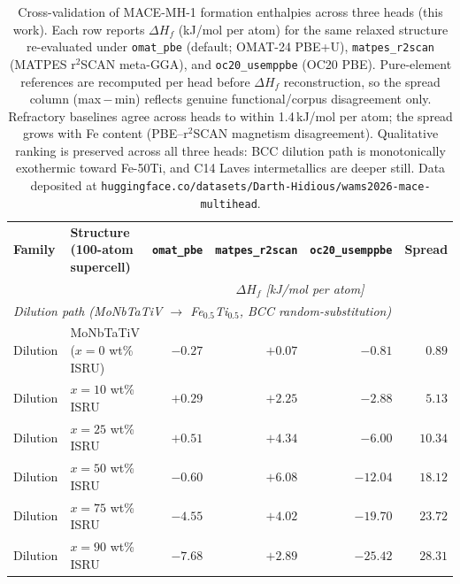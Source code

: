 \documentclass[11pt,a4paper]{article}
\begin{document}
\begin{landscape}
\begin{table}[p]
\centering
\caption{Cross-validation of MACE-MH-1 formation enthalpies across three heads (this work). Each row reports $\Delta H_f$ (kJ/mol per atom) for the same relaxed structure re-evaluated under \texttt{omat\_pbe} (default; OMAT-24 PBE+U), \texttt{matpes\_r2scan} (MATPES r$^2$SCAN meta-GGA), and \texttt{oc20\_usemppbe} (OC20 PBE). Pure-element references are recomputed per head before $\Delta H_f$ reconstruction, so the spread column (max\,$-$\,min) reflects genuine functional/corpus disagreement only. Refractory baselines agree across heads to within 1.4\,kJ/mol per atom; the spread grows with Fe content (PBE--r$^2$SCAN magnetism disagreement). Qualitative ranking is preserved across all three heads: BCC dilution path is monotonically exothermic toward Fe-50Ti, and C14 Laves intermetallics are deeper still. Data deposited at \texttt{huggingface.co/datasets/Darth-Hidious/wams2026-mace-multihead}.}
\label{tab:multihead}
\footnotesize
\begin{tabular}{llrrrr}
\toprule
\textbf{Family} &
  \textbf{Structure (100-atom supercell)} &
  \multicolumn{1}{c}{\textbf{\texttt{omat\_pbe}}} &
  \multicolumn{1}{c}{\textbf{\texttt{matpes\_r2scan}}} &
  \multicolumn{1}{c}{\textbf{\texttt{oc20\_usemppbe}}} &
  \multicolumn{1}{c}{\textbf{Spread}} \\
  & &
  \multicolumn{4}{c}{\textit{$\Delta H_f$ [kJ/mol per atom]}} \\
\midrule
\multicolumn{6}{l}{\textit{Dilution path (MoNbTaTiV $\rightarrow$ Fe$_{0.5}$Ti$_{0.5}$, BCC random-substitution)}} \\
Dilution & MoNbTaTiV \hfill ($x = 0$ wt\% ISRU)         &  $-0.27$ & $+0.07$  & $-0.81$  & $0.89$ \\
Dilution & $x = 10$ wt\% ISRU                           & $+0.29$  & $+2.25$  & $-2.88$  & $5.13$ \\
Dilution & $x = 25$ wt\% ISRU                           & $+0.51$  & $+4.34$  & $-6.00$  & $10.34$ \\
Dilution & $x = 50$ wt\% ISRU                           &  $-0.60$ & $+6.08$  & $-12.04$ & $18.12$ \\
Dilution & $x = 75$ wt\% ISRU                           &  $-4.55$ & $+4.02$  & $-19.70$ & $23.72$ \\
Dilution & $x = 90$ wt\% ISRU                           &  $-7.68$ & $+2.89$  & $-25.42$ & $28.31$ \\

\end{tabular}
\end{table}
\end{landscape}
\end{document}
